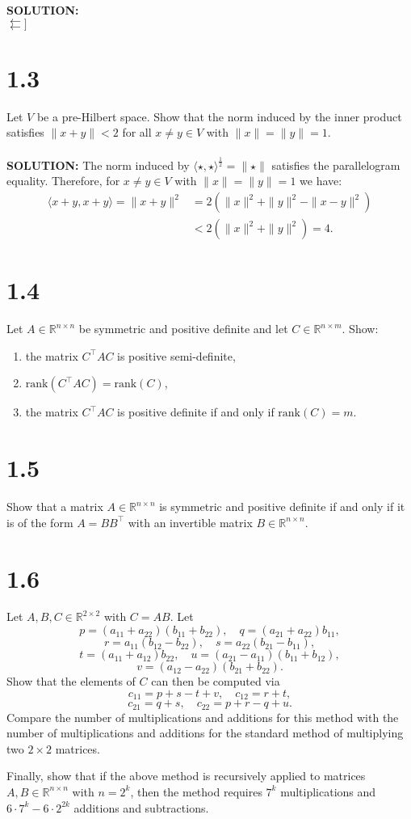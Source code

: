 \documentclass{article}
\begin{document}
\noindent \textbf{SOLUTION: }\\
$\leftleftarrows]$

\section*{1.3}
Let $V$ be a pre-Hilbert space. Show that the norm induced by the inner product satisfies $\|x + y\| < 2$ for all $x \neq y \in V$ with $\|x\| = \|y\| = 1$.
\\
\\
\noindent \textbf{SOLUTION: }
The norm induced by $\langle \star, \star \rangle^{\frac{1}{2}} =  \| \star \|$ satisfies the parallelogram equality. Therefore, 
for $x \neq y \in V$ with $\|x\| = \|y\| = 1$ we have:
\begin{align*}
    \langle x + y , x + y  \rangle = \|x + y\|^2 &= 2(\|x\|^2 + \|y\|^2 - \|x-y\|^2)\\ 
    &< 2(\|x\|^2 + \|y\|^2) = 4.
\end{align*}
\section*{1.4}
Let $A \in \mathbb{R}^{n \times n}$ be symmetric and positive definite and let $C \in \mathbb{R}^{n \times m}$. Show:
\begin{enumerate}
    \item the matrix $C^\top AC$ is positive semi-definite,
    \item $\text{rank}(C^\top AC) = \text{rank}(C)$,
    \item the matrix $C^\top AC$ is positive definite if and only if $\text{rank}(C) = m$.
\end{enumerate}

\section*{1.5}
Show that a matrix $A \in \mathbb{R}^{n \times n}$ is symmetric and positive definite if and only if it is of the form $A = B B^\top$ with an invertible matrix $B \in \mathbb{R}^{n \times n}$.

\section*{1.6}
Let $A, B, C \in \mathbb{R}^{2 \times 2}$ with $C = AB$. Let
\[
p = (a_{11} + a_{22})(b_{11} + b_{22}), \quad q = (a_{21} + a_{22})b_{11},
\]
\[
r = a_{11}(b_{12} - b_{22}), \quad s = a_{22}(b_{21} - b_{11}),
\]
\[
t = (a_{11} + a_{12})b_{22}, \quad u = (a_{21} - a_{11})(b_{11} + b_{12}),
\]
\[
v = (a_{12} - a_{22})(b_{21} + b_{22}).
\]
Show that the elements of $C$ can then be computed via
\[
c_{11} = p + s - t + v, \quad c_{12} = r + t,
\]
\[
c_{21} = q + s, \quad c_{22} = p + r - q + u.
\]
Compare the number of multiplications and additions for this method with the number of multiplications and additions for the standard method of multiplying two $2 \times 2$ matrices.

Finally, show that if the above method is recursively applied to matrices $A, B \in \mathbb{R}^{n \times n}$ with $n = 2^k$, then the method requires $7^k$ multiplications and $6 \cdot 7^k - 6 \cdot 2^{2k}$ additions and subtractions.
\end{document}
